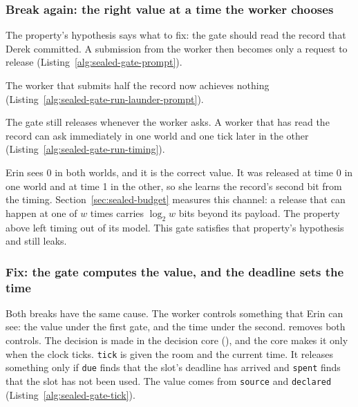 \subsubsection{Break again: the right value at a time the worker chooses}

The property's hypothesis says what to fix: the gate should read the
record that Derek committed. A submission from the worker then becomes
only a request to release (Listing~\ref{alg:sealed-gate-prompt}).


The worker that submits half the record now achieves nothing
(Listing~\ref{alg:sealed-gate-run-launder-prompt}).


The gate still releases whenever the worker asks. A worker that has read
the record can ask immediately in one world and one tick later in the
other (Listing~\ref{alg:sealed-gate-run-timing}).


Erin sees 0 in both worlds, and it is the correct value. It was released
at time 0 in one world and at time 1 in the other, so she learns the
record's second bit from the timing. Section~\ref{sec:sealed-budget}
measures this channel: a release that can happen at one of $w$ times
carries $\log_2 w$ bits beyond its payload. The property above left timing
out of its model. This gate satisfies that property's hypothesis and still
leaks.

\subsubsection{Fix: the gate computes the value, and the deadline sets the time}

Both breaks have the same cause. The worker controls something that Erin
can see: the value under the first gate, and the time under the second.
\pdkernelname{} removes both controls. The decision is made in the
decision core (), and the
core makes it only when the clock ticks. \texttt{tick} is given the room
and the current time. It releases something only if \texttt{due} finds
that the slot's deadline has arrived and \texttt{spent} finds that the
slot has not been used. The value comes from \texttt{source} and
\texttt{declared} (Listing~\ref{alg:sealed-gate-tick}).


